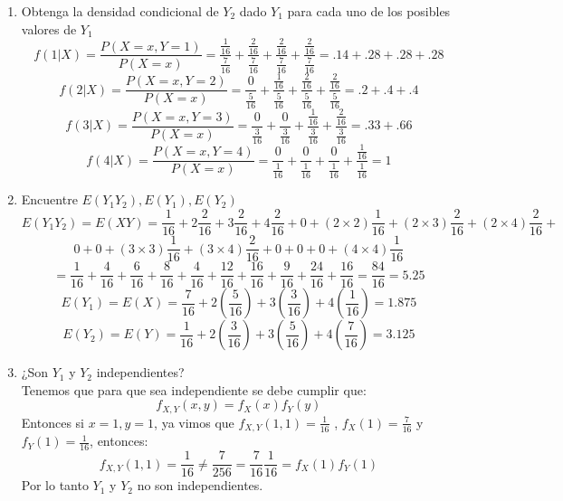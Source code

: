 \documentclass[11pt,a4paper]{report}
\begin{document}
\begin{enumerate}
{\begin{enumerate}
		        \item{Obtenga la densidad condicional de $Y_{2}$ dado $Y_{1}$ para cada uno de los posibles valores de $Y_{1}$}
		        \[ f(1|X) =\frac{P(X = x, Y = 1)}{P(X = x)} =
		        \frac{\frac{1}{16}}{\frac{7}{16}} +
		        \frac{\frac{2}{16}}{\frac{7}{16}} +
		        \frac{\frac{2}{16}}{\frac{7}{16}} +
		        \frac{\frac{2}{16}}{\frac{7}{16}} =
		        .14 + .28 + .28 + .28\]
		        \[ f(2|X) =\frac{P(X = x, Y = 2)}{P(X = x)} =
		        \frac{0}{\frac{5}{16}} +
		        \frac{\frac{1}{16}}{\frac{5}{16}} +
		        \frac{\frac{2}{16}}{\frac{5}{16}} +
		        \frac{\frac{2}{16}}{\frac{5}{16}} =
		        .2 + .4 + .4\]
		        \[ f(3|X) =\frac{P(X = x, Y = 3)}{P(X = x)} =
		        \frac{0}{\frac{3}{16}} +
		        \frac{0}{\frac{3}{16}} +
		        \frac{\frac{1}{16}}{\frac{3}{16}} +
		        \frac{\frac{2}{16}}{\frac{3}{16}} =
		        .33 + .66\]
		        \[ f(4|X) =\frac{P(X = x, Y = 4)}{P(X = x)} =
		        \frac{0}{\frac{1}{16}} +
		        \frac{0}{\frac{1}{16}} +
		        \frac{0}{\frac{1}{16}} +
		        \frac{\frac{1}{16}}{\frac{1}{16}} = 1\]
		        \item{Encuentre $E(Y_{1}Y_{2}),E(Y_{1}),E(Y_{2})$}\\
		        \[E(Y_{1}Y_{2}) = E(XY) =
		        \frac{1}{16} + 2\frac{2}{16} +3\frac{2}{16} +4\frac{2}{16} +
		       0 + (2\times2)\frac{1}{16} + (2\times3)\frac{2}{16} + (2\times4)\frac{2}{16} +\]
		        \[0 + 0 + (3\times3)\frac{1}{16} + (3\times4)\frac{2}{16} + 0 + 0 + 0 + (4\times4)\frac{1}{16}\]
		        \[= \frac{1}{16} + \frac{4}{16} + \frac{6}{16} + \frac{8}{16} + \frac{4}{16} + \frac{12}{16} + \frac{16}{16} +
			\frac{9}{16} + \frac{24}{16} + \frac{16}{16} = \frac{84}{16} = 5.25\]
		        \[E(Y_1) = E(X) = \frac{7}{16} + 2(\frac{5}{16}) + 3(\frac{3}{16}) + 4(\frac{1}{16}) = 1.875\]
		        \[E(Y_2) = E(Y) = \frac{1}{16} + 2(\frac{3}{16}) + 3(\frac{5}{16}) + 4(\frac{7}{16}) = 3.125\]

		        \item{¿Son $Y_{1} $ y $Y_{2}$ independientes?}\\
		        Tenemos que para que sea independiente se debe cumplir que:
		        \[f_{X,Y}(x,y) = f_X(x)f_Y(y)\]
		        Entonces si $x=1,y=1$, ya vimos que $f_{X,Y}(1,1) = \frac{1}{16}$ , $f_X(1) = \frac{7}{16}$ y $f_Y(1) =
			\frac{1}{16}$, entonces:
		         \[f_{X,Y}(1,1) = \frac{1}{16} \neq \frac{7}{256} = \frac{7}{16}\frac{1}{16} = f_X(1)f_Y(1)\]
		         Por lo tanto $Y_1$ y $Y_2$ no son independientes.


\end{enumerate}}
\end{enumerate}
\end{document}
